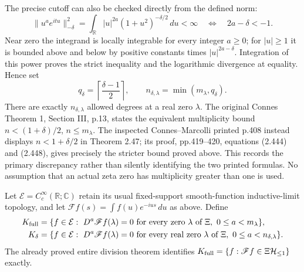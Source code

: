 The precise cutoff can also be checked directly from the defined norm:
\[
 \|u^a e^{itu}\|_{-\delta}^2
   =\int_{\mathbb R}|u|^{2a}(1+u^2)^{-\delta/2}\,du<\infty
 \quad\Longleftrightarrow\quad 2a-\delta<-1.
\]
Near zero the integrand is locally integrable for every integer $a\geq0$;
for $|u|\geq1$ it is bounded above and below by positive constants
times $|u|^{2a-\delta}$. Integration of this power proves the strict
inequality and the logarithmic divergence at equality. Hence set
\begin{equation}\label{eq:cq-sobolev-jetcount}
 q_\delta=\left\lceil\frac{\delta-1}{2}\right\rceil,
 \qquad n_{\delta,\lambda}=\min(m_\lambda,q_\delta).
\end{equation}
There are exactly $n_{\delta,\lambda}$ allowed degrees at a real zero
$\lambda$. The original Connes Theorem 1, Section III, p.13, states
the equivalent multiplicity bound $n<(1+\delta)/2$, $n\leq m_\lambda$.
The inspected Connes--Marcolli printed p.408 instead displays
$n<1+\delta/2$ in Theorem 2.47; its proof, pp.419--420,
equations (2.444) and (2.448), gives precisely the stricter bound
proved above. This records the primary discrepancy rather than
silently identifying the two printed formulas. No assumption that
an actual zeta zero has multiplicity greater than one is used.

Let $\mathcal E=C_c^\infty(\mathbb R;\mathbb C)$ retain its usual
fixed-support smooth-function inductive-limit topology, and let
$\mathscr Ff(s)=\int f(u)e^{-ius}\,du$ as above. Define
\begin{align}
 K_{\rm full}
   &=\{f\in\mathcal E:\ D^a\mathscr Ff(\lambda)=0
               \text{ for every zero }\lambda\text{ of }\Xi,
                         \ 0\leq a<m_\lambda\},
       \label{eq:cq-sobolev-full-kernel}\\
 K_\delta
   &=\{f\in\mathcal E:\ D^a\mathscr Ff(\lambda)=0
               \text{ for every real zero }\lambda\text{ of }\Xi,
                         \ 0\leq a<n_{\delta,\lambda}\}.
       \label{eq:cq-sobolev-kernel}
\end{align}
The already proved entire division theorem identifies
$K_{\rm full}=\{f:\mathscr Ff\in\Xi\mathcal H_{\leq 1}\}$ exactly.

